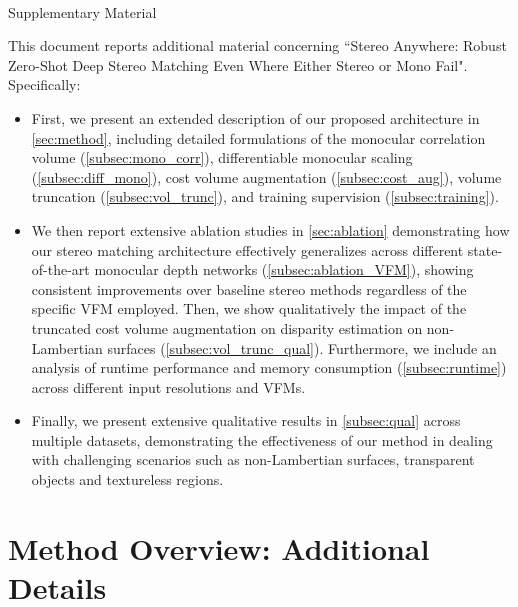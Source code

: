 \documentclass[10pt,twocolumn,letterpaper]{article}
\begin{document}
{
    \small
    
    
}

\clearpage
%
\onecolumn

{
    \clearpage
    \centering
    \Large
    \textbf{\thetitle}\\
    \vspace{0.5em}Supplementary Material \\
    \vspace{1.0em}
}

This document reports additional material concerning ``Stereo Anywhere: Robust Zero-Shot Deep Stereo Matching Even Where Either Stereo or Mono Fail". Specifically:

\begin{itemize}
    \item First, we present an extended description of our proposed architecture in \cref{sec:method}, including detailed formulations of the monocular correlation volume (\cref{subsec:mono_corr}), differentiable monocular scaling (\cref{subsec:diff_mono}), cost volume augmentation (\cref{subsec:cost_aug}), volume truncation (\cref{subsec:vol_trunc}), and training supervision (\cref{subsec:training}).

    \item We then report extensive ablation studies in \cref{sec:ablation} demonstrating how our stereo matching architecture effectively generalizes across different state-of-the-art monocular depth networks (\cref{subsec:ablation_VFM}), showing consistent improvements over baseline stereo methods regardless of the specific VFM employed.
    Then, we show qualitatively the impact of the truncated cost volume augmentation on disparity estimation on non-Lambertian surfaces (\cref{subsec:vol_trunc_qual}). Furthermore, we include an analysis of runtime performance and memory consumption (\cref{subsec:runtime}) across different input resolutions and VFMs.

    \item Finally, we present extensive qualitative results in \cref{subsec:qual} across multiple datasets, demonstrating the effectiveness of our method in dealing with challenging scenarios such as non-Lambertian surfaces, transparent objects and textureless regions.
\end{itemize}


\phantom{Invisible Text}
\vspace{-\baselineskip}

\section{Method Overview: Additional Details}
\end{document}
